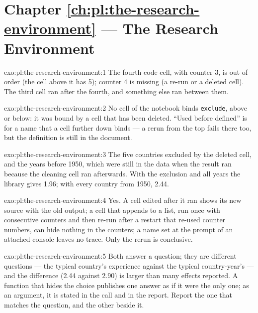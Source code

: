 \section*{Chapter \ref{ch:pl:the-research-environment} --- The Research Environment}

\begin{solution}{exo:pl:the-research-environment:1}
The fourth code cell, with counter 3, is out of order (the cell above it has 5); counter 4 is missing (a re-run or a deleted cell). The
third cell ran after the fourth, and something else ran between them.
\end{solution}

\begin{solution}{exo:pl:the-research-environment:2}
No cell of the notebook binds \texttt{exclude}, above or below: it was bound by a cell that has been deleted. ``Used before defined'' is for a
name that a cell further down binds --- a rerun from the top fails there too, but the definition is still in the document.
\end{solution}

\begin{solution}{exo:pl:the-research-environment:3}
The five countries excluded by the deleted cell, and the years before 1950, which were still in the data when the result ran because the
cleaning cell ran afterwards. With the exclusion and all years the library gives 1.96; with every country from 1950, 2.44.
\end{solution}

\begin{solution}{exo:pl:the-research-environment:4}
Yes. A cell edited after it ran shows its new source with the old output; a cell that appends to a list, run once with consecutive counters and
then re-run after a restart that re-used counter numbers, can hide nothing in the counters; a name set at the prompt of an attached console
leaves no trace. Only the rerun is conclusive.
\end{solution}

\begin{solution}{exo:pl:the-research-environment:5}
Both answer a question; they are different questions --- the typical country's experience against the typical country-year's --- and the
difference (2.44 against 2.90) is larger than many effects reported. A function that hides the choice publishes one answer as if it were the
only one; as an argument, it is stated in the call and in the report. Report the one that matches the question, and the other beside it.
\end{solution}

